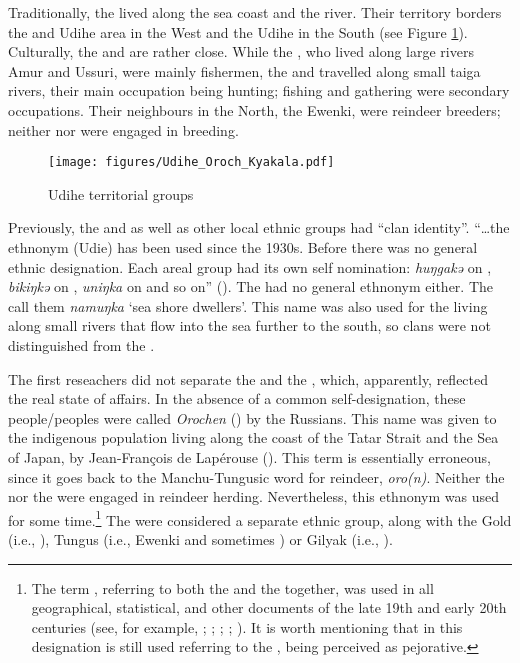 \documentclass[output=paper,colorlinks,citecolor=brown]{langscibook}
\begin{document}
Traditionally, the  lived along the sea coast and the  river. Their territory borders the  and  Udihe area in the West and the  Udihe in the South (see Figure \ref{fig:7:1}). Culturally, the  and  are rather close. While the , who lived along large rivers Amur and Ussuri, were mainly fishermen, the  and  travelled along small taiga rivers, their main occupation being hunting; fishing and gathering were secondary occupations. Their neighbours in the North, the Ewenki, were reindeer breeders; neither  nor  were engaged in breeding.

\begin{figure}
\texttt{[image: figures/Udihe\_Oroch\_Kyakala.pdf]}
\caption{Udihe territorial groups\label{fig:7:1}}
\end{figure}

Previously, the  and  as well as other local ethnic groups had “clan identity”. “…the ethnonym  (Udie) has been used since the 1930s. Before there was no general ethnic designation. Each areal group had its own self nomination: \textit{huŋgakə} on , \textit{bikiŋkə} on , \textit{uniŋka} on  and so on” (\citealt[142]{Suliandzigaetal2003}). The  had no general ethnonym either. The  call them \textit{namuŋka} ‘sea shore dwellers’. This name was also used for the  living along small rivers that flow into the sea further to the south, so  clans were not distinguished from the .

The first reseachers did not separate the  and the , which, apparently, reflected the real state of affairs. In the absence of a common self-designation, these people\slash peoples were called \textit{Orochen} (\textit{}) by the Russians. This name was given to the indigenous population living along the coast of the Tatar Strait and the Sea of Japan, by Jean-François de Lapérouse (\citealt[142]{Shrenk1883}). This term is essentially erroneous, since it goes back to the Manchu-Tungusic word for reindeer, \textit{oro(n)}. Neither the  nor the  were engaged in reindeer herding. Nevertheless, this ethnonym was used for some time.\footnote{The term \textit{}, referring to both the  and the  together, was used in all geographical, statistical, and other documents of the late 19th and early 20th centuries (see, for example, \citealt{Shrenk1883}; \citealt{Nadarov1887}; \citealt{Margaritov1888}; \citealt{Protodjakonov1888}; \citealt{Przevalskij1990}). It is worth mentioning that in  this designation is still used referring to the , being perceived as pejorative.} The \textit{} were considered a separate ethnic group, along with the Gold (i.e., ), Tungus (i.e., Ewenki and sometimes ) or Gilyak (i.e., ).
\end{document}
